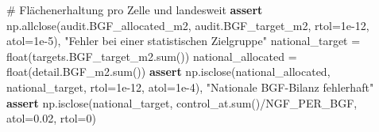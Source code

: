 \documentclass[
  ngerman,
  a4paper,
  DIV=11]{scrreprt}
\newenvironment{Shaded}{\begin{snugshade}}{\end{snugshade}}
\newcommand{\BuiltInTok}[1]{\textcolor[rgb]{0.00,0.23,0.31}{#1}}
\newcommand{\CommentTok}[1]{\textcolor[rgb]{0.37,0.37,0.37}{#1}}
\newcommand{\ControlFlowTok}[1]{\textcolor[rgb]{0.00,0.23,0.31}{\textbf{#1}}}
\newcommand{\DecValTok}[1]{\textcolor[rgb]{0.68,0.00,0.00}{#1}}
\newcommand{\FloatTok}[1]{\textcolor[rgb]{0.68,0.00,0.00}{#1}}
\newcommand{\NormalTok}[1]{\textcolor[rgb]{0.00,0.23,0.31}{#1}}
\newcommand{\OperatorTok}[1]{\textcolor[rgb]{0.37,0.37,0.37}{#1}}
\newcommand{\StringTok}[1]{\textcolor[rgb]{0.13,0.47,0.30}{#1}}
\begin{document}
\begin{Shaded}
\begin{Highlighting}[]
\CommentTok{\# Flächenerhaltung pro Zelle und landesweit}
\ControlFlowTok{assert}\NormalTok{ np.allclose(audit.BGF\_allocated\_m2, audit.BGF\_target\_m2,}
\NormalTok{                   rtol}\OperatorTok{=}\FloatTok{1e{-}12}\NormalTok{, atol}\OperatorTok{=}\FloatTok{1e{-}5}\NormalTok{), }\StringTok{"Fehler bei einer statistischen Zielgruppe"}
\NormalTok{national\_target }\OperatorTok{=} \BuiltInTok{float}\NormalTok{(targets.BGF\_target\_m2.}\BuiltInTok{sum}\NormalTok{())}
\NormalTok{national\_allocated }\OperatorTok{=} \BuiltInTok{float}\NormalTok{(detail.BGF\_m2.}\BuiltInTok{sum}\NormalTok{())}
\ControlFlowTok{assert}\NormalTok{ np.isclose(national\_allocated, national\_target, rtol}\OperatorTok{=}\FloatTok{1e{-}12}\NormalTok{, atol}\OperatorTok{=}\FloatTok{1e{-}4}\NormalTok{), }\StringTok{"Nationale BGF{-}Bilanz fehlerhaft"}
\ControlFlowTok{assert}\NormalTok{ np.isclose(national\_target, control\_at.}\BuiltInTok{sum}\NormalTok{()}\OperatorTok{/}\NormalTok{NGF\_PER\_BGF, atol}\OperatorTok{=}\FloatTok{0.02}\NormalTok{, rtol}\OperatorTok{=}\DecValTok{0}\NormalTok{)}


\end{Highlighting}
\end{Shaded}
\end{document}
